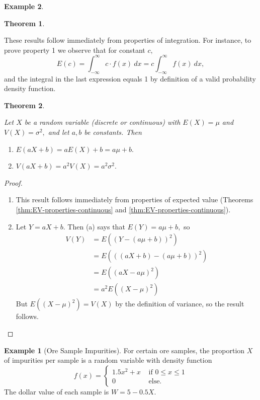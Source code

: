 \documentclass[
]{book}
\providecommand{\tightlist}{%
  \setlength{\itemsep}{0pt}\setlength{\parskip}{0pt}}
\newtheorem{theorem}{Theorem}[chapter]
\theoremstyle{definition}
\theoremstyle{definition}
\newtheorem{example}{Example}[chapter]
\theoremstyle{definition}
\theoremstyle{definition}
\theoremstyle{remark}
\begin{document}
\begin{example}
\begin{theorem}
\end{theorem}

These results follow immediately from properties of integration. For instance, to prove property 1 we observe
that for constant \(c,\)
\[E(c) = \int_{-\infty}^\infty c\cdot f(x)~ dx  = c \int_{-\infty}^\infty f(x)~ dx,\]
and the integral in the last expression equals 1 by definition of a valid probability density function.

\begin{theorem}
\protect\hypertarget{thm:EV-linear-props}{}\label{thm:EV-linear-props}

Let \(X\) be a random variable (discrete or continuous) with \(E(X) = \mu\) and \(V(X) = \sigma^2,\) and let \(a, b\) be constants. Then

\begin{enumerate}
\def\labelenumi{\alph{enumi})}
\tightlist
\item
  \(\displaystyle E(aX + b) = aE(X) + b = a \mu + b.\)
\item
  \(\displaystyle V(aX + b) = a^2V(X) = a^2 \sigma^2.\)
\end{enumerate}

\end{theorem}

\begin{proof}
\leavevmode

\begin{enumerate}
\def\labelenumi{\alph{enumi})}
\item
  This result follows immediately from properties of expected value (Theorems \ref{thm:EV-properties-continuous} and \ref{thm:EV-properties-continuous}).
\item
  Let \(Y = aX + b\). Then (a) says that \(E(Y) = a \mu + b,\) so
  \begin{align*}
  V(Y) &= E((Y-(a\mu + b))^2) \\
   &= E\left(((aX+b)-(a\mu + b))^2\right)\\
   &= E\left((aX-a\mu)^2\right)\\
   &= a^2 E\left((X-\mu)^2\right)
  \end{align*}
  But \(E\left((X-\mu)^2\right)=V(X)\) by the definition of variance, so the result follows.
\end{enumerate}

\end{proof}

\begin{example}[Ore Sample Impurities]
\protect\hypertarget{exm:ore-samples}{}\label{exm:ore-samples}For certain ore samples, the proportion \(X\) of impurities per sample is a random variable with density function
\[
f(x)=
\begin{cases}
1.5x^2 + x &\text{ if }0 \leq x \leq 1 \\
0 &\text{ else. }
\end{cases}
\]
The dollar value of each sample is \(W = 5 - 0.5X\).


\end{example}
\end{example}
\end{document}
